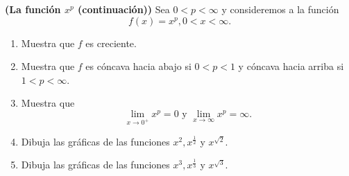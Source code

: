 \documentclass[12pt,a4paper]{article}
\begin{document}
    \begin{mdframed}[style=mdbluebox,frametitle={Ejercicio 5}]
        \textbf{(La función $x^{p}$ (continuación))} Sea $0\lt p\lt\infty$ y consideremos
        a la función
        \begin{equation*}
            f(x)=x^{p},0\lt x\lt\infty.
        \end{equation*}
        \begin{enumerate}
            \item[(a)] Muestra que $f$ es creciente.
            \item[(b)] Muestra que $f$ es cóncava hacia abajo si $0\lt p\lt1$ y cóncava
            hacia arriba si $1\lt p\lt\infty$.
            \item[(c)] Muestra que
            \begin{equation*}
                \lim_{x\to0^{+}}x^{p}=0\text{ y }\lim_{x\to\infty}x^{p}=\infty.
            \end{equation*}
            \item[(d)] Dibuja las gráficas de las funciones $x^{2},x^{\frac{1}{2}}$ y $x^{\sqrt{2}}$.
            \item[(e)] Dibuja las gráficas de las funciones $x^{3},x^{\frac{1}{3}}$ y $x^{\sqrt{3}}$. 
        \end{enumerate}
    \end{mdframed}

    \vspace{2.5cm}
\end{document}
